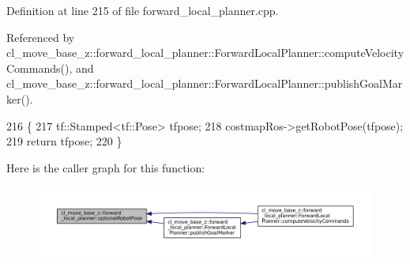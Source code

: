 Definition at line 215 of file forward\+\_\+local\+\_\+planner.\+cpp.



Referenced by cl\+\_\+move\+\_\+base\+\_\+z\+::forward\+\_\+local\+\_\+planner\+::\+Forward\+Local\+Planner\+::compute\+Velocity\+Commands(), and cl\+\_\+move\+\_\+base\+\_\+z\+::forward\+\_\+local\+\_\+planner\+::\+Forward\+Local\+Planner\+::publish\+Goal\+Marker().


\begin{DoxyCode}
216 \{
217     tf::Stamped<tf::Pose> tfpose;
218     costmapRos->getRobotPose(tfpose);
219     \textcolor{keywordflow}{return} tfpose;
220 \}
\end{DoxyCode}
Here is the caller graph for this function\+:
\nopagebreak
\begin{figure}[H]
\begin{center}
\leavevmode
\includegraphics[width=350pt]{namespacecl__move__base__z_1_1forward__local__planner_a4c20f9fe0ca67779c53e90182baf4997_icgraph}
\end{center}
\end{figure}
